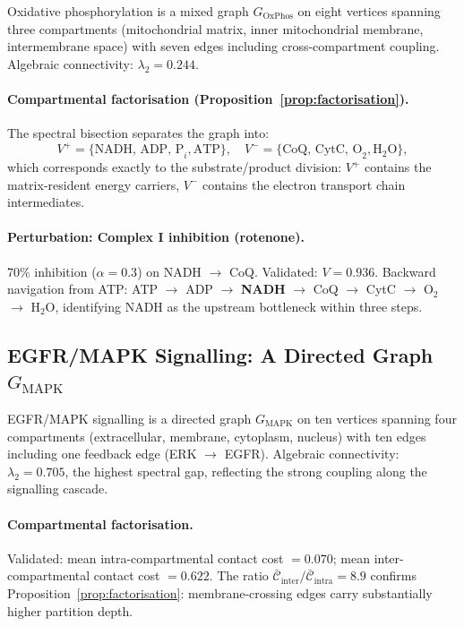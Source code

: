 \documentclass[11pt,twocolumn]{article}
\theoremstyle{plain}
\theoremstyle{definition}
\newcommand{\CC}{\mathcal{C}}
\begin{document}
Oxidative phosphorylation is a mixed graph $G_{\text{OxPhos}}$ on eight vertices
spanning three compartments (mitochondrial matrix, inner mitochondrial membrane,
intermembrane space) with seven edges including cross-compartment coupling.
Algebraic connectivity: $\lambda_2 = 0.244$.

\paragraph{Compartmental factorisation (Proposition~\ref{prop:factorisation}).}
The spectral bisection separates the graph into:
\[
  V^+ = \{\text{NADH, ADP, P}_i, \text{ATP}\}, \quad
  V^- = \{\text{CoQ, CytC, O}_2, \text{H}_2\text{O}\},
\]
which corresponds exactly to the substrate/product division: $V^+$ contains the
matrix-resident energy carriers, $V^-$ contains the electron transport chain
intermediates.

\paragraph{Perturbation: Complex I inhibition (rotenone).}
70\% inhibition ($\alpha = 0.3$) on NADH $\to$ CoQ. Validated: $V = 0.936$.
Backward navigation from ATP: ATP $\to$ ADP $\to$ \textbf{NADH} $\to$ CoQ
$\to$ CytC $\to$ O$_2$ $\to$ H$_2$O, identifying NADH as the upstream
bottleneck within three steps.

\subsection{EGFR/MAPK Signalling: A Directed Graph $G_{\text{MAPK}}$}

EGFR/MAPK signalling is a directed graph $G_{\text{MAPK}}$ on ten vertices
spanning four compartments (extracellular, membrane, cytoplasm, nucleus) with
ten edges including one feedback edge (ERK $\to$ EGFR). Algebraic connectivity:
$\lambda_2 = 0.705$, the highest spectral gap, reflecting the strong coupling
along the signalling cascade.

\paragraph{Compartmental factorisation.}
Validated: mean intra-compartmental contact cost $= 0.070$; mean
inter-compartmental contact cost $= 0.622$. The ratio
$\bar{\CC}_{\text{inter}} / \bar{\CC}_{\text{intra}} = 8.9$ confirms
Proposition~\ref{prop:factorisation}: membrane-crossing edges carry
substantially higher partition depth.
\end{document}
